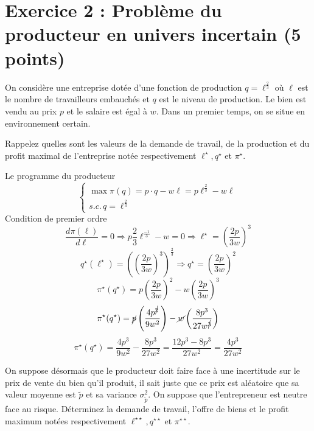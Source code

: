 \documentclass[12pt, a4paper]{exam}
\begin{document}
\section*{Exercice 2 : Problème du producteur en univers incertain (5 points)}

On considère une entreprise dotée d'une fonction de production \(q=\ell^{\frac{2}{3}}\) où \(\ell\) est le nombre de travailleurs embauchés et \(q\) est le niveau de production. Le bien est vendu au prix \(p\) et le salaire est égal à \(w\). Dans un premier temps, on se situe en environnement certain. 

\begin{questions}
	\question[1,25] Rappelez quelles sont les valeurs de la demande de travail, de la production et du profit maximal de l'entreprise notée respectivement \(\ell^{\star}\),\,\(q^{\star}\) et \(\pi^{\star}\). 

\begin{solution}
Le programme du producteur
\[  
\begin{cases}
	\max \pi(q)= p\cdot q -w\ell=p\ell^{\frac{2}{3}}-w\ell\\
	s.c. \, q = \ell^{\frac{2}{3}}
\end{cases}
\]
Condition de premier ordre 
\[ 
\frac{d \pi(\ell)}{d \ell}=0 \Rightarrow p\frac{2}{3}\ell^{\frac{-1}{3}}-w=0\Rightarrow \ell^{\star}=\left(\frac{2p}{3w} \right)^3 
 \]
\[ 
q^{\star}(\ell^{\star})=\left( \left(\frac{2p}{3w} \right)^3\right)^{\frac{2}{3}} \Rightarrow q^{\star}=\left(\frac{2p}{3w} \right)^2
\]
\[ 
\pi^{\star}(q^{\star})=p\left(\frac{2p}{3w} \right)^2- w\left(\frac{2p}{3w} \right)^3 
\]
\[ 
\pi^{\star}(q^{\star})= \cancel{p} \left(\frac{4p^{\cancel{2}}}{9w^2} \right)- \cancel{w}\left(\frac{8p^3}{27w^{\cancel{3}}} \right) 
 \]
\[ 
\pi^{\star}(q^{\star})=\frac{4p^3}{9w^2}-\frac{8p^3}{27w^2}=\frac{12p^3-8p^3}{27w^2}=\frac{4p^3}{27w^2}
 \]
\end{solution}

	\question[2,50] On suppose désormais que le producteur doit faire face à une incertitude sur le prix de vente du bien qu'il produit, il sait juste que ce prix est aléatoire que sa valeur moyenne est \(\tilde{p}\) et sa variance \(\sigma^2_{\tilde{p}}\). On suppose que l'entrepreneur est neutre face au risque. Déterminez la demande de travail, l'offre de biens et le profit maximum notées respectivement \(\ell^{\star\star}\),\,\(q^{\star\star}\) et \(\pi^{\star\star}\). 



\end{questions}
\end{document}
